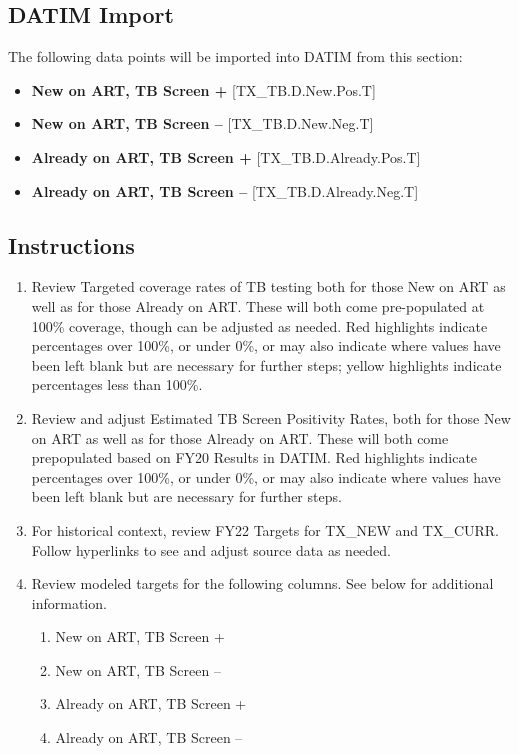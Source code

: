 \documentclass[
  openany]{book}
\begin{document}
\hypertarget{datim-import-33}{%
\subsection{DATIM Import}\label{datim-import-33}}

The following data points will be imported into DATIM from this section:

\begin{itemize}
\item
  \textbf{New on ART, TB Screen +} {[}TX\_TB.D.New.Pos.T{]}
\item
  \textbf{New on ART, TB Screen --} {[}TX\_TB.D.New.Neg.T{]}
\item
  \textbf{Already on ART, TB Screen +} {[}TX\_TB.D.Already.Pos.T{]}
\item
  \textbf{Already on ART, TB Screen --} {[}TX\_TB.D.Already.Neg.T{]}
\end{itemize}

\hypertarget{instructions-33}{%
\subsection{Instructions}\label{instructions-33}}

\begin{enumerate}
\def\labelenumi{\arabic{enumi}.}
\item
  Review Targeted coverage rates of TB testing both for those New on
  ART as well as for those Already on ART. These will both come
  pre-populated at 100\% coverage, though can be adjusted as needed.
  Red highlights indicate percentages over 100\%, or under 0\%, or may
  also indicate where values have been left blank but are necessary
  for further steps; yellow highlights indicate percentages less than
  100\%.
\item
  Review and adjust Estimated TB Screen Positivity Rates, both for
  those New on ART as well as for those Already on ART. These will
  both come prepopulated based on FY20 Results in DATIM. Red
  highlights indicate percentages over 100\%, or under 0\%, or may also
  indicate where values have been left blank but are necessary for
  further steps.
\item
  For historical context, review FY22 Targets for TX\_NEW and TX\_CURR.
  Follow hyperlinks to see and adjust source data as needed.
\item
  Review modeled targets for the following columns. See below for
  additional information.

  \begin{enumerate}
  \def\labelenumii{\alph{enumii}.}
  \item
    New on ART, TB Screen +
  \item
    New on ART, TB Screen --
  \item
    Already on ART, TB Screen +
  \item
    Already on ART, TB Screen --
  \end{enumerate}
\end{enumerate}
\end{document}
